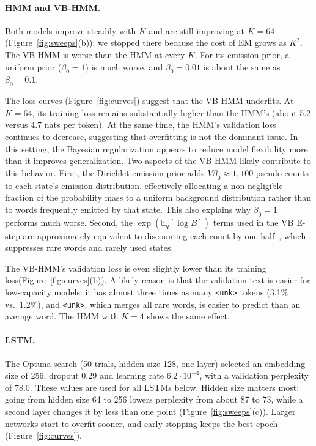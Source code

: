 \documentclass[11pt]{article}
\begin{document}
\paragraph{HMM and VB-HMM.} Both models improve steadily with $K$ and are still improving at $K = 64$ (Figure~\ref{fig:sweeps}(b)): we stopped there because the cost of EM grows as
$K^2$. The VB-HMM is worse than the HMM at every $K$.
For its emission prior, a
uniform prior ($\beta_0 = 1$) is much worse, and $\beta_0 = 0.01$ is
about the same as $\beta_0 = 0.1$.

The loss curves (Figure~\ref{fig:curves}) suggest that the VB-HMM
underfits. At $K=64$, its training loss remains substantially higher
than the HMM's (about 5.2 versus 4.7 nats per token). At the same time,
the HMM's validation loss continues to decrease, suggesting that
overfitting is not the dominant issue. In this setting, the Bayesian
regularization appears to reduce model flexibility more than it improves
generalization.
Two aspects of the VB-HMM likely contribute to this behavior. First, the
Dirichlet emission prior adds $V\beta_0 \approx 1{,}100$ pseudo-counts to each state's
emission distribution,
effectively allocating a non-negligible fraction of the probability mass
to a uniform background distribution rather than to words frequently
emitted by that state. This also explains why $\beta_0=1$ performs much
worse. Second, the $\exp(\mathbb{E}_q[\log B])$ terms used in the VB
E-step are approximately equivalent to discounting each count by one half~\cite{johnson2007,asuncion2009}, which suppresses
rare words and rarely used states.

The VB-HMM's validation loss is even slightly lower than its training
loss(Figure~\ref{fig:curves}(b)). A likely reason is that the validation text is easier for
low-capacity models: it has almost three times as many \texttt{<unk>}
tokens (3.1\% vs.\ 1.2\%), and \texttt{<unk>}, which merges all rare
words, is easier to predict than an average word. The HMM with $K = 4$
shows the same effect.


\paragraph{LSTM.} The Optuna search (50 trials, hidden size 128, one
layer) selected an embedding size of 256, dropout 0.29 and learning
rate $6.2 \cdot 10^{-4}$, with a validation perplexity of 78.0. These
values are used for all LSTMs below. Hidden size matters most: going
from hidden size 64 to 256 lowers perplexity from about 87 to 73, while a
second layer changes it by less than one point
(Figure~\ref{fig:sweeps}(c)). Larger networks start to overfit sooner,
and early stopping keeps the best epoch (Figure~\ref{fig:curves}).
\end{document}
